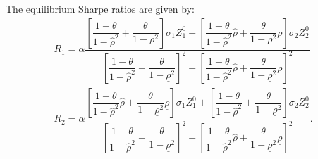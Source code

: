 \documentclass[10pt]{article}
\begin{document}
The equilibrium Sharpe ratios are given by:
\begin{eqnarray}
& R_1 = \alpha \dfrac{\left[ \dfrac{1 - \theta}{1 - {\hat \rho}^2} + \dfrac{\theta}{1 - \underline{\rho}^2} \right] \sigma_1 Z_1^0 + \left[ \dfrac{1 - \theta}{1 - {\hat \rho}^2} {\hat \rho} + \dfrac{\theta}{1 - \underline{\rho}^2} \underline{\rho} \right] \sigma_2 Z_2^0}{\left[ \dfrac{1 - \theta}{1 - {\hat \rho}^2} + \dfrac{\theta}{1 - \underline{\rho}^2} \right]^2 - \left[ \dfrac{1 - \theta}{1 - {\hat \rho}^2} {\hat \rho} + \dfrac{\theta}{1 - \underline{\rho}^2} \underline{\rho} \right]^2} & \\
& R_2 = \alpha \dfrac{\left[ \dfrac{1 - \theta}{1 - {\hat \rho}^2} {\hat \rho} + \dfrac{\theta}{1 - \underline{\rho}^2} \underline{\rho} \right] \sigma_1 Z_1^0 + \left[ \dfrac{1 - \theta}{1 - {\hat \rho}^2} + \dfrac{\theta}{1 - \underline{\rho}^2} \right] \sigma_2 Z_2^0}{\left[ \dfrac{1 - \theta}{1 - {\hat \rho}^2} + \dfrac{\theta}{1 - \underline{\rho}^2} \right]^2 - \left[ \dfrac{1 - \theta}{1 - {\hat \rho}^2} {\hat \rho} + \dfrac{\theta}{1 - \underline{\rho}^2} \underline{\rho} \right]^2}. &
\end{eqnarray}
\end{document}
